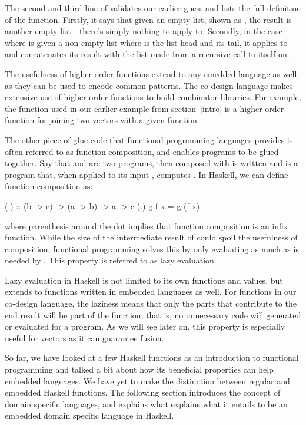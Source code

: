 \documentclass[../main.tex]{subfiles}
\begin{document}
The second and third line of  validates our earlier guess and lists the full definition of the function. Firstly, it says that given an empty list, shown as \codei{[]}, the result is another empty list---there's simply nothing to apply  to. Secondly, in the case where  is given a non-empty list  where  is the list head and  its tail, it applies  to  and concatenates its result with the list made from a recursive call to itself on .

The usefulness of higher-order functions extend to any emedded language as well, as they can be used to encode common patterns. The co-design language makes extensive use of higher-order functions to build combinator libraries. For example, the  function used in our earlier  example from section~\ref{intro} is a higher-order function for joining two vectors with a given function.

The other piece of glue code that functional programming languages provides is often referred to as function composition, and enables programs to be glued together. Say that  and  are two programs, then  composed with  is written  and is a program that, when applied to its input , computes . In Haskell, we can define function composition as:

\begin{code}
(.) :: (b -> c) -> (a -> b) -> a -> c
(.) g f x = g (f x)
\end{code}

\noindent where parenthesis around the dot implies that function composition is an infix function. While the size of the intermediate result of  could spoil the usefulness of composition, functional programming solves this by only evaluating  as much as is needed by . This property is referred to as lazy evaluation.

Lazy evaluation in Haskell is not limited to its own functions and values, but extends to functions written in embedded languages as well. For functions in our co-design language, the laziness means that only the parts that contribute to the end result will be part of the function, that is, no unnecessary code will generated or evaluated for a program. As we will see later on, this property is especially useful for vectors as it can guarantee fusion.

So far, we have looked at a few Haskell functions as an introduction to functional programming and talked a bit about how its beneficial properties can help embedded languages. We have yet to make the distinction between regular and embedded Haskell functions. The following section introduces the concept of domain specific languages, and explains what explains what it entails to be an embedded domain specific language in Haskell.
\end{document}
